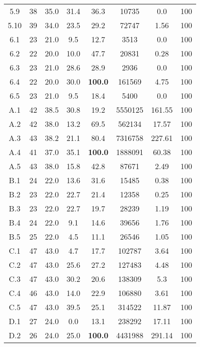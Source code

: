 \begin{longtable}{@{\extracolsep{5pt}}cccccccc}
	5.9 &
		38 & 35.0 &
			31.4
		&
			36.3
		& 10735 & 0.0 & 100
	\\
	5.10 &
		39 & 34.0 &
			23.5
		&
			29.2
		& 72747 & 1.56 & 100
	\\
	6.1 &
		23 & 21.0 &
			9.5
		&
			12.7
		& 3513 & 0.0 & 100
	\\
	6.2 &
		22 & 20.0 &
			10.0
		&
			47.7
		& 20831 & 0.28 & 100
	\\
	6.3 &
		23 & 21.0 &
			28.6
		&
			28.9
		& 2936 & 0.0 & 100
	\\
	6.4 &
		22 & 20.0 &
			30.0
		&
			\textbf{100.0}
		& 161569 & 4.75 & 100
	\\
	6.5 &
		23 & 21.0 &
			9.5
		&
			18.4
		& 5400 & 0.0 & 100
	\\
	A.1 &
		42 & 38.5 &
			30.8
		&
			19.2
		& 5550125 & 161.55 & 100
	\\
	A.2 &
		42 & 38.0 &
			13.2
		&
			69.5
		& 562134 & 17.57 & 100
	\\
	A.3 &
		43 & 38.2 &
			21.1
		&
			80.4
		& 7316758 & 227.61 & 100
	\\
	A.4 &
		41 & 37.0 &
			35.1
		&
			\textbf{100.0}
		& 1888091 & 60.38 & 100
	\\
	A.5 &
		43 & 38.0 &
			15.8
		&
			42.8
		& 87671 & 2.49 & 100
	\\
	B.1 &
		24 & 22.0 &
			13.6
		&
			31.6
		& 15485 & 0.38 & 100
	\\
	B.2 &
		23 & 22.0 &
			22.7
		&
			21.4
		& 12358 & 0.25 & 100
	\\
	B.3 &
		23 & 22.0 &
			22.7
		&
			19.7
		& 28239 & 1.19 & 100
	\\
	B.4 &
		24 & 22.0 &
			9.1
		&
			14.6
		& 39656 & 1.76 & 100
	\\
	B.5 &
		25 & 22.0 &
			4.5
		&
			11.1
		& 26546 & 1.05 & 100
	\\
	C.1 &
		47 & 43.0 &
			4.7
		&
			17.7
		& 102787 & 3.64 & 100
	\\
	C.2 &
		47 & 43.0 &
			25.6
		&
			27.2
		& 127483 & 4.48 & 100
	\\
	C.3 &
		47 & 43.0 &
			30.2
		&
			20.6
		& 138309 & 5.3 & 100
	\\
	C.4 &
		46 & 43.0 &
			14.0
		&
			22.9
		& 106880 & 3.61 & 100
	\\
	C.5 &
		47 & 43.0 &
			39.5
		&
			25.1
		& 314522 & 11.87 & 100
	\\
	D.1 &
		27 & 24.0 &
			0.0
		&
			13.1
		& 238292 & 17.11 & 100
	\\
	D.2 &
		26 & 24.0 &
			25.0
		&
			\textbf{100.0}
		& 4431988 & 291.14 & 100
	\\

\end{longtable}
